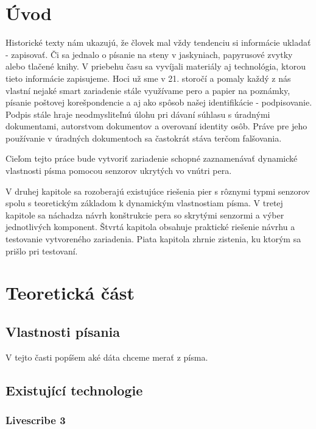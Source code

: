 \chapter{Úvod}

Historické texty nám ukazujú, že človek mal vždy tendenciu si informácie ukladať - zapisovať. Či sa jednalo o písanie na steny v jaskyniach, papyrusové zvytky alebo tlačené knihy. V priebehu času sa vyvíjali materiály aj technológia, ktorou tieto informácie zapisujeme. Hoci už sme v 21. storočí a pomaly každý z nás vlastní nejaké smart zariadenie stále využívame pero a papier na poznámky, písanie poštovej korešpondencie a aj ako spôsob našej identifikácie - podpisovanie. Podpis stále hraje neodmysliteľnú úlohu pri dávaní súhlasu s úradnými dokumentami, autorstvom dokumentov a overovaní identity osôb. Práve pre jeho používanie v úradných dokumentoch sa častokrát stáva terčom falšovania.

Cieľom tejto práce bude vytvoriť zariadenie schopné zaznamenávať dynamické vlastnosti písma pomocou senzorov ukrytých vo vnútri pera. 

V druhej kapitole sa rozoberajú existujúce riešenia pier s rôznymi typmi senzorov spolu s teoretickým základom k dynamickým vlastnostiam písma. V tretej kapitole sa náchadza návrh konštrukcie pera so skrytými senzormi a výber jednotlivých komponent. Štvrtá kapitola obsahuje praktické riešenie návrhu a testovanie vytvoreného zariadenia. Piata kapitola zhrnie zistenia, ku ktorým sa prišlo pri testovaní.

\chapter{Teoretická část}

\section{Vlastnosti písania}

V tejto časti popíšem aké dáta chceme merať z písma.

\section{Existující technologie}

\subsection*{Livescribe 3}

